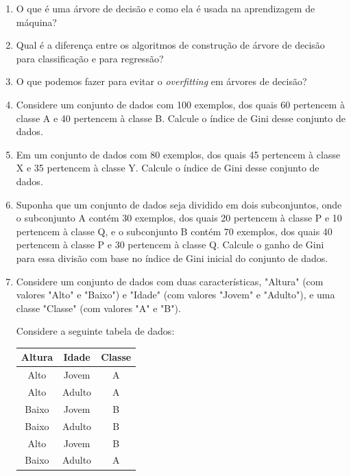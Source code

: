 \documentclass{article}
\begin{document}
    \begin{enumerate}

    \item O que é uma árvore de decisão e como ela é usada na aprendizagem de máquina?

    \item Qual é a diferença entre os algoritmos de construção de árvore de decisão para classificação e para regressão?

    \item O que podemos fazer para evitar o \textit{overfitting} em árvores de decisão?

    \item Considere um conjunto de dados com 100 exemplos, dos quais 60 pertencem à classe A e 40 pertencem à classe B. Calcule o índice de Gini desse conjunto de dados.

    \item Em um conjunto de dados com 80 exemplos, dos quais 45 pertencem à classe X e 35 pertencem à classe Y. Calcule o índice de Gini desse conjunto de dados.

    \item Suponha que um conjunto de dados seja dividido em dois subconjuntos, onde o subconjunto A contém 30 exemplos, dos quais 20 pertencem à classe P e 10 pertencem à classe Q, e o subconjunto B contém 70 exemplos, dos quais 40 pertencem à classe P e 30 pertencem à classe Q. Calcule o ganho de Gini para essa divisão com base no índice de Gini inicial do conjunto de dados.

   \item Considere um conjunto de dados com duas características, "Altura" (com valores "Alto" e "Baixo") e "Idade" (com valores "Jovem" e "Adulto"), e uma classe "Classe" (com valores "A" e "B"). 
   
   Considere a seguinte tabela de dados:

    \begin{center}
    \begin{tabular}{ |c|c|c| }
    \hline
    Altura & Idade & Classe \\
    \hline
    Alto & Jovem & A \\
    Alto & Adulto & A \\
    Baixo & Jovem & B \\
    Baixo & Adulto & B \\
    Alto & Jovem & B \\
    Baixo & Adulto & A \\
    \hline
    \end{tabular}
    \end{center}
   

\end{enumerate}
\end{document}
